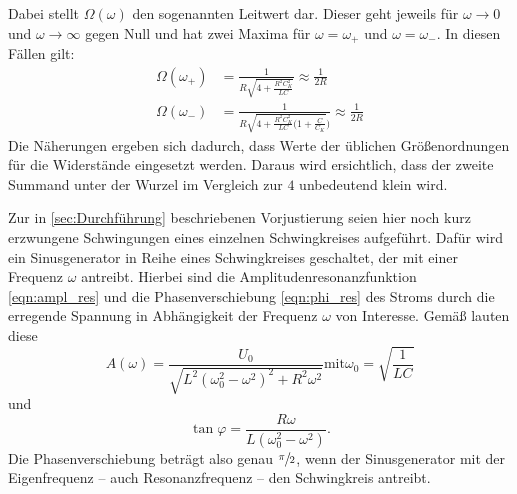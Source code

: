 Dabei stellt $\Omega (\omega)$ den sogenannten Leitwert dar. 
Dieser geht jeweils für ${\omega \to 0}$ und ${\omega \to \infty }$ gegen Null und hat zwei Maxima für ${\omega = \omega _+}$ und 
${\omega = \omega _-}$. 
In diesen Fällen gilt:
\begin{align}
    \Omega (\omega _+) &= \frac{1}{R\sqrt{4 + \frac{R^2C_K^2}{LC}}} \approx \frac{1}{2R} \\
    \Omega (\omega _-) &= \frac{1}{R\sqrt{4 + \frac{R^2C_K^2}{LC}(1 + \frac{C}{C_K}})} \approx \frac{1}{2R}  
\end{align}
Die Näherungen ergeben sich dadurch, dass Werte der üblichen Größenordnungen für die Widerstände eingesetzt werden.
Daraus wird ersichtlich, dass der zweite Summand unter der Wurzel im Vergleich zur $4$ unbedeutend klein wird. 

Zur in \ref{sec:Durchführung} beschriebenen Vorjustierung seien hier noch kurz erzwungene Schwingungen eines einzelnen 
Schwingkreises aufgeführt. 
Dafür wird ein Sinusgenerator in Reihe eines Schwingkreises geschaltet, der mit einer Frequenz $\omega$ antreibt. 
Hierbei sind die Amplitudenresonanzfunktion \eqref{eqn:ampl_res} und die Phasenverschiebung \eqref{eqn:phi_res} des Stroms 
durch die erregende Spannung in 
Abhängigkeit der Frequenz $\omega$ von Interesse. 
Gemäß \cite{gerthsen} lauten diese 
\begin{equation}
    A(\omega)=\frac{U_0}{\sqrt{L^2(\omega _0^2 -\omega^2)^2 +R^2\omega^2}} \text{mit} 
    \omega _0=\sqrt{\frac{1}{LC}}
    \label{eqn:ampl_res}
\end{equation}
und 
\begin{equation}
    \tan \varphi=\frac{R\omega}{L(\omega _0^2 -\omega^2)} .
    \label{eqn:phi_res}
\end{equation}
Die Phasenverschiebung beträgt also genau $\sfrac{\pi}{2}$, wenn der Sinusgenerator mit der Eigenfrequenz -- auch 
Resonanzfrequenz -- den Schwingkreis antreibt. 